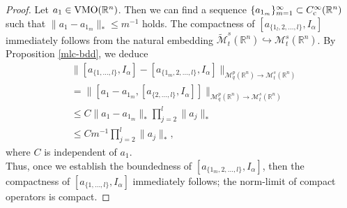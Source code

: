 \documentclass[11pt,a4]{article}
\numberwithin{equation}{section}
\theoremstyle{definition}
\theoremstyle{remark}
\begin{document}
\begin{proof}
Let $a_1 \in {\rm VMO}({\mathbb R}^n)$. Then we can find a sequence $\{ a_{1_m}\}_{m=1}^{\infty} \subset C^\infty_{\rm c}({\mathbb R}^n)$ such that $\|a_1-a_{1_m} \|_* \leq m^{-1}$ holds. The compactness of $[a_{\{1_l,2, ... , l\}},I_{\alpha}]$ immediately follows from the natural embedding $\widetilde{\mathcal M}^{s}_t({\mathbb R}^n) \hookrightarrow {\mathcal M}^{s}_t({\mathbb R}^n)$. By Proposition \ref{mlc-bdd}, we deduce 
	\begin{align*}
		&\| [a_{\{1, ... , l\}},I_{\alpha}] - [a_{\{1_m,2, ... , l\}},I_{\alpha}] \|_{{\mathcal M}^p_q({\mathbb R}^n) \rightarrow {\mathcal M}^s_t({\mathbb R}^n)} \\
		&= \| [a_1-a_{1_m}, [a_{\{2, ... , l\}},I_{\alpha}]] \|_{{\mathcal M}^p_q({\mathbb R}^n) \rightarrow {\mathcal M}^s_t({\mathbb R}^n)} \\
		&\leq C\|a_1-a_{1_m} \|_* \prod_{j=2}^l \|a_j\|_*\\
		&\le C m^{-1} \prod_{j=2}^l \|a_j\|_*,
	\end{align*}
where $C$ is independent of $a_1$. \\
Thus, once we establish the boundedness of $[a_{\{1_m,2, ... , l\}},I_{\alpha}]$, then the compactness of $[a_{\{1, ... , l\}},I_{\alpha}]$  immediately follows; the norm-limit of compact operators is compact. 

\end{proof}
\end{document}
